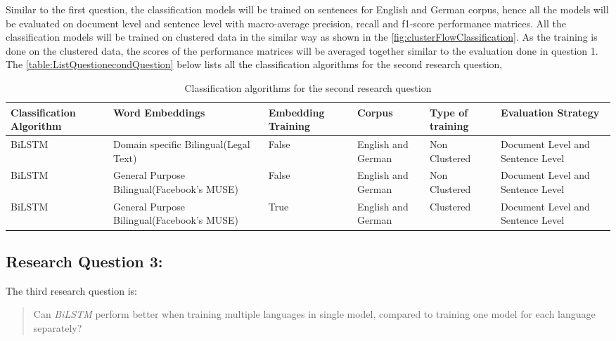 Similar to the first question, the classification models will be trained on sentences for English and German corpus, hence all the models will be evaluated on document level and sentence level with macro-average precision, recall and f1-score performance matrices. All the classification models will be trained on clustered data in the similar way as shown in the  \ref{fig:clusterFlowClassification}. As the training is done on the clustered data, the scores of the performance matrices will be averaged together similar to the evaluation done in question 1.
\clearpage
The \ref{table:ListQuestionecondQuestion} below lists all the classification algorithms for the second research question,
\begin{table}[!ht]
\begin{tabular}{>{\centering\arraybackslash}m{2cm}>{\centering\arraybackslash}m{2.9cm}>{\centering\arraybackslash}m{1.8cm}>{\centering\arraybackslash}m{2cm}>{\centering\arraybackslash}m{1.9cm}>{\centering\arraybackslash}m{2cm}}
\hline
\textbf{Classification Algorithm} & \textbf{Word Embeddings} & \textbf{Embedding Training} & \textbf{Corpus} & \textbf{Type of training} & \textbf{Evaluation Strategy} \\ \hline
\gls{BiLSTM} & Domain specific Bilingual(Legal Text) & False & English and German & Non Clustered & Document Level and Sentence Level \\
\gls{BiLSTM} & General Purpose Bilingual(Facebook's MUSE) & False & English and German & Non Clustered & Document Level and Sentence Level \\
\gls{BiLSTM} & General Purpose Bilingual(Facebook's MUSE) & True & English and German & Clustered & Document Level and Sentence Level \\ \hline
\end{tabular}
\caption{Classification algorithms for the second research question}
\label{table:ListQuestionSecondQuestion}
\end{table}

\subsection{Research Question 3:} \label{question3}

The third research question is:

\begin{quote}
    Can \textit{\gls{BiLSTM}} perform better when training multiple languages in single model, compared to training one model for each language separately?
\end{quote}

